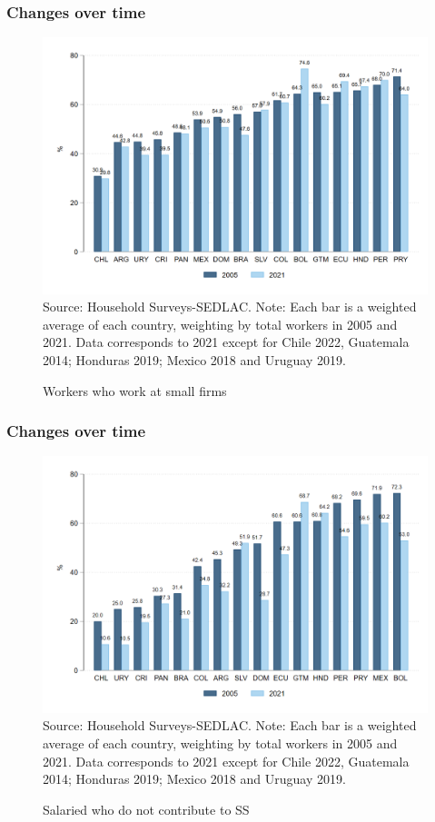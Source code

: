 \documentclass{beamer}
\begin{document}
\begin{frame}
\frametitle{Changes over time}
\begin{figure}[!htb]
    \justifying
     \caption{Workers who work at small firms}     
     \includegraphics[width=0.5\linewidth]{latex/figures/Snapshot/snapshot_workers_small.png}
    \label{fig:SalariedSmall}
    \footnotesize{Source: Household Surveys-SEDLAC.}
    \footnotesize{Note: Each bar is a weighted average of each country, weighting by total workers in 2005 and 2021.  Data corresponds to 2021 except for Chile 2022, Guatemala 2014; Honduras 2019; Mexico 2018 and Uruguay 2019.}
\end{figure}
\end{frame}

\begin{frame}
\frametitle{Changes over time}
\begin{figure}[!htb]
    \justifying
     \caption{Salaried who do not contribute to SS}     
       \includegraphics[width=0.5\linewidth]
       {latex/figures/Snapshot/snapshot_informal_ss_dep.png}
    \label{fig:SalariedSS}
    \footnotesize{Source: Household Surveys-SEDLAC.}
    \footnotesize{Note: Each bar is a weighted average of each country, weighting by total workers in 2005 and 2021.  Data corresponds to 2021 except for Chile 2022, Guatemala 2014; Honduras 2019; Mexico 2018 and Uruguay 2019.}
\end{figure}


    
\end{frame}
\end{document}
